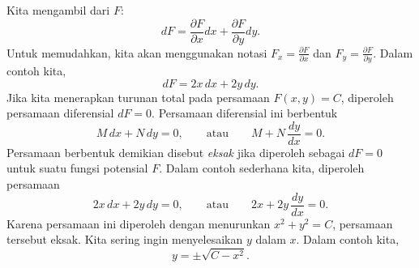 Kita mengambil
\emph{} dari
$F$:
\begin{equation*}
dF = \frac{\partial F}{\partial x} dx + \frac{\partial F}{\partial y} dy .
\end{equation*}
Untuk memudahkan,
kita akan menggunakan notasi
$F_x = \frac{\partial F}{\partial x}$ dan
$F_y = \frac{\partial F}{\partial y}$.
Dalam contoh kita,
\begin{equation*}
dF = 2x \, dx + 2y \, dy .
\end{equation*}
Jika kita menerapkan turunan total pada persamaan $F(x,y) = C$, diperoleh
persamaan diferensial $dF = 0$.  Persamaan diferensial ini
berbentuk
\begin{equation*}
M \, dx + N \, dy = 0, \qquad
\text{atau} \qquad
M + N \, \frac{dy}{dx} = 0 .
\end{equation*}
Persamaan berbentuk demikian
disebut \emph{eksak} jika diperoleh sebagai $dF = 0$ untuk suatu fungsi
potensial $F$.
Dalam contoh sederhana kita, diperoleh persamaan
\begin{equation*}
2x \, dx + 2y \, dy = 0, \qquad
\text{atau} \qquad
2x + 2y \, \frac{dy}{dx} = 0 .
\end{equation*}
Karena persamaan ini diperoleh dengan menurunkan $x^2+y^2=C$,
persamaan tersebut eksak.
Kita sering ingin menyelesaikan $y$ dalam $x$.  Dalam contoh kita,
\begin{equation*}
y = \pm \sqrt{C-x^2} .
\end{equation*}

